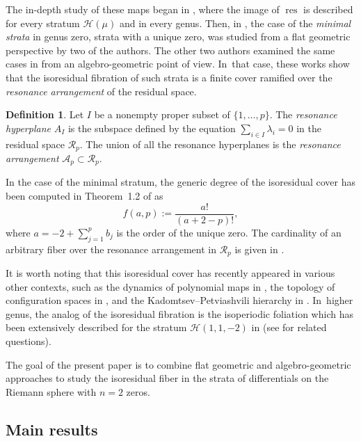 \documentclass[JEP,XML,SOM,Unicode,NoFloatCountersInSection,published]{cedram}
\DeclareMathOperator{\res}{res}
\theoremstyle{definition}
\newtheorem{defn}[thm]{Definition}
\begin{document}
The in-depth study of these maps began in \cite{getaab}, where the image of $\res$ is described for every stratum $\mathcal{H}(\mu)$ and in every genus. Then, in \cite{GeTaIso}, the case of the {\em minimal strata} in genus zero, \ie strata with a unique zero, was studied from a flat geometric perspective by two of the authors. The other two authors examined the same cases in \cite{ChPrIso} from an algebro-geometric point of view. In~that case, these works show that the isoresidual fibration of such strata is a finite cover ramified over the \textit{resonance arrangement} of the residual space.
\begin{defn}\label{defn:resonanceintro}
Let $I$ be a nonempty proper subset of $\{1,\dots,p\}$. The \textit{resonance hyperplane} $A_{I}$ is the subspace defined by the equation $\sum_{i \in I} \lambda_{i} = 0$ in the residual space $\mathcal{R}_{p}$. The union of all the resonance hyperplanes is the \textit{resonance arrangement} $\mathcal{A}_{p} \subset \mathcal{R}_{p}$.
\end{defn}
In the case of the minimal stratum, the generic degree of the isoresidual cover has been computed in Theorem~1.2 of \cite{GeTaIso} as
\begin{equation}\label{eq:degree}
f(a,p):=\frac{a!}{(a+2-p)!},
\end{equation}
where $a = -2+\sum_{j=1}^{p}b_{j}$ is the order of the unique zero. The cardinality of an arbitrary fiber over the resonance arrangement in $\mathcal{R}_{p}$ is given in \cite[Th.\,1.2]{ChPrIso}.

It is worth noting that this isoresidual cover has recently appeared in various other contexts, such as the dynamics of polynomial maps in \cite{Sugiyama}, the topology of configuration spaces in \cite{SaBraid}, and the Kadomtsev--Petviashvili hierarchy in \cite{BuRoCoun}. In~higher genus, the analog of the isoresidual fibration is the isoperiodic foliation which has been extensively described for the stratum $\mathcal{H}(1,1,-2)$ in \cite{FaTaZa} (see \cite{KLS,CMDisoper,BGPA} for related questions).

The goal of the present paper is to combine flat geometric and algebro-geometric approaches to study the isoresidual fiber in the strata of differentials on the Riemann sphere with $n=2$ zeros.

\subsection{Main results}
\end{document}

